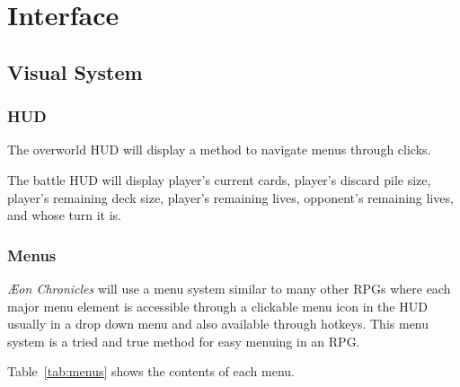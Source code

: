 \documentclass[12pt,titlepage]{article}
\newcommand\gametitle{\textit{\AE on Chronicles}\xspace}
\begin{document}



\newpage
\section{Interface}

\subsection{Visual System}

\subsubsection{HUD}

The overworld HUD will display a method to navigate menus through clicks.

The battle HUD will display player's current cards, player's discard pile size, 
player's remaining deck size, player's remaining lives, opponent's remaining 
lives, and whose turn it is.

\subsubsection{Menus}

\gametitle will use a menu system similar to many other RPGs where each major 
menu element is accessible through a clickable menu icon in the HUD usually in 
a drop down menu and also available through hotkeys. This menu system is a 
tried and true method for easy menuing in an RPG.

Table~\ref{tab:menus} shows the contents of each menu.
\end{document}
